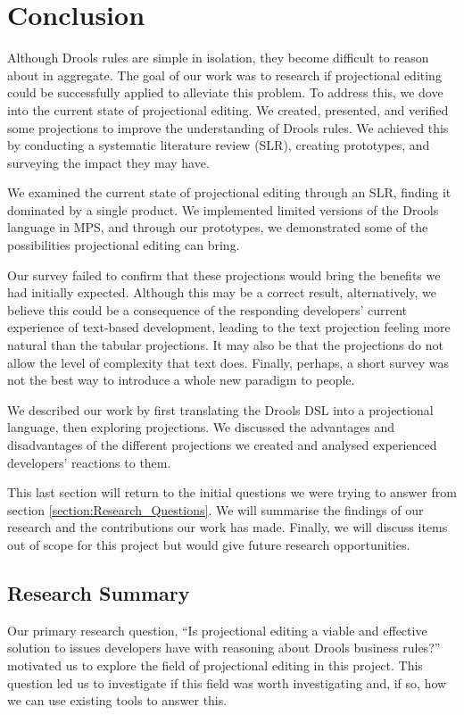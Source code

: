 \chapter{Conclusion}
\label{chapter:Conclusion}

Although Drools rules are simple in isolation, they become difficult to reason about in aggregate.
The goal of our work was to research if projectional editing could be successfully applied to alleviate this problem.
To address this, we dove into the current state of projectional editing.
We created, presented, and verified some projections to improve the understanding of Drools rules.
We achieved this by conducting a systematic literature review (SLR), creating prototypes, and surveying the impact they may have.

We examined the current state of projectional editing through an SLR, finding it dominated by a single product.
We implemented limited versions of the Drools language in MPS, and through our prototypes, we demonstrated some of the possibilities projectional editing can bring.

Our survey failed to confirm that these projections would bring the benefits we had initially expected.
Although this may be a correct result, alternatively, we believe this could be a consequence of the responding developers' current experience of text-based development, leading to the text projection feeling more natural than the tabular projections.
It may also be that the projections do not allow the level of complexity that text does.
Finally, perhaps, a short survey was not the best way to introduce a whole new paradigm to people.  

We described our work by first translating the Drools DSL into a projectional language, then exploring projections.
We discussed the advantages and disadvantages of the different projections we created and analysed experienced developers' reactions to them.

This last section will return to the initial questions we were trying to answer from section \ref{section:Research_Questions}. 
We will summarise the findings of our research and the contributions our work has made.
Finally, we will discuss items out of scope for this project but would give future research opportunities.

\section{Research Summary}
Our primary research question, ``Is projectional editing a viable and effective solution to issues developers have with reasoning about Drools business rules?'' motivated us to explore the field of projectional editing in this project.
This question led us to investigate if this field was worth investigating and, if so, how we can use existing tools to answer this.

